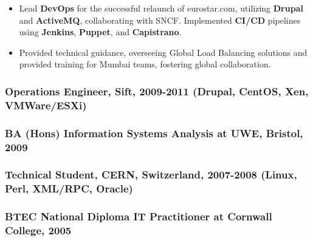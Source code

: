 \documentclass[
]{article}
\begin{document}
\begin{itemize}
\item
  Lead \textbf{DevOps} for the successful relaunch of eurostar.com,
  utilizing \textbf{Drupal} and \textbf{ActiveMQ}, collaborating with
  SNCF. Implemented \textbf{CI/CD} pipelines using \textbf{Jenkins},
  \textbf{Puppet}, and \textbf{Capistrano}.
\item
  Provided technical guidance, overseeing Global Load Balancing
  solutions and provided training for Mumbai teams, fostering global
  collaboration.
\end{itemize}

\hypertarget{material-office-building-operations-engineer-sift-2009-2011-drupal-centos-xen-vmwareesxi}{%
\subsubsection{\texorpdfstring{\faBuilding Operations Engineer, Sift,
2009-2011 {(Drupal, CentOS, Xen,
VMWare/ESXi)}}{ Operations Engineer, Sift, 2009-2011 (Drupal, CentOS, Xen, VMWare/ESXi)}}\label{material-office-building-operations-engineer-sift-2009-2011-drupal-centos-xen-vmwareesxi}}

\hypertarget{material-school-ba-hons-information-systems-analysis-at-uwe-bristol-2009}{%
\subsubsection{\texorpdfstring{\faSchool BA (Hons) Information Systems
Analysis at UWE, Bristol,
2009}{ BA (Hons) Information Systems Analysis at UWE, Bristol, 2009}}\label{material-school-ba-hons-information-systems-analysis-at-uwe-bristol-2009}}

\hypertarget{material-atom-technical-student-cern-switzerland-2007-2008-linux-perl-xmlrpc-oracle}{%
\subsubsection{\texorpdfstring{\faAtom Technical Student, CERN,
Switzerland, 2007-2008 (Linux, Perl, XML/RPC,
Oracle)}{ Technical Student, CERN, Switzerland, 2007-2008 (Linux, Perl, XML/RPC, Oracle)}}\label{material-atom-technical-student-cern-switzerland-2007-2008-linux-perl-xmlrpc-oracle}}

\hypertarget{material-school-btec-national-diploma-it-practitioner-at-cornwall-college-2005}{%
\subsubsection{\texorpdfstring{\faSchool BTEC National Diploma IT
Practitioner at Cornwall College,
2005}{ BTEC National Diploma IT Practitioner at Cornwall College, 2005}}\label{material-school-btec-national-diploma-it-practitioner-at-cornwall-college-2005}}
\end{document}
